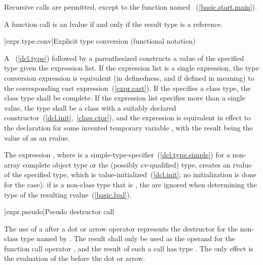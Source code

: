 \pnum
{}%
Recursive calls are permitted, except to the function named
~(\ref{basic.start.main}).

\pnum
A function call is an lvalue if and only if the result type is a reference.

[expr.type.conv]{Explicit type conversion (functional notation)}

\pnum
{}
%
%
%
%
A ~(\ref{dcl.type}) followed by a
parenthesized  constructs a value of the
specified type given the expression list. If the expression list is a
single expression, the type conversion expression is equivalent (in
definedness, and if defined in meaning) to the corresponding cast
expression~(\ref{expr.cast}).
%
If the  specifies a class type, the
class type shall be complete. If the expression list specifies more than
a single value, the type shall be a class with a suitably declared
constructor~(\ref{dcl.init},~\ref{class.ctor}), and the expression
 is equivalent in effect to the declaration
 for some invented temporary variable
, with the result being the value of  as an rvalue.

\pnum
The expression , where  is a
simple-type-specifier~(\ref{dcl.type.simple}) for a non-array complete object
type or the (possibly cv-qualified)  type, creates an rvalue of the
specified type, which is value-initialized~(\ref{dcl.init}; no
initialization is done for the  case).
\enternote 
if  is a non-class type that is , the
 are ignored when determining the type of the
resulting rvalue~(\ref{basic.lval}).
\exitnote 

[expr.pseudo]{Pseudo destructor call}

\pnum
{}
%
%
The use of a  after a dot  or
arrow \tcode{->} operator represents the destructor for the non-class
type named by . The result shall only be used as the
operand for the function call operator \tcode{()}, and the result of
such a call has type . The only effect is the evaluation of
the  before the dot or arrow.

